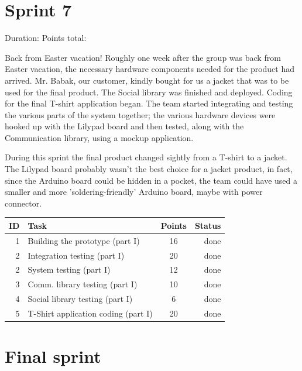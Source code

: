 \newpage

\section{Sprint 7}

Duration:
Points total:

Back from Easter vacation! Roughly one week after the group
was back from Easter vacation, the necessary hardware components needed for the product
had arrived. Mr. Babak, our customer, kindly bought for us a jacket that was to be used
for the final product. The Social library was finished and deployed.
Coding for the final T-shirt application began. The team started integrating
and testing the various parts of the system together; the various hardware devices were
hooked up with the Lilypad board and then tested, along with the Communication library,
using a mockup application.

During this sprint the final product changed sightly from a T-shirt to a jacket.
The Lilypad board probably wasn't the best choice for a jacket product, in fact,
since the Arduino board could be hidden in a pocket, the team could have used a smaller
and more 'soldering-friendly' Arduino board, maybe with power connector.

\begin{table}[ht!]
\begin{tabular}{ | r | l | c | r | }

\hline
\textbf{ID} & \textbf{Task} & \textbf{Points} & \textbf{Status} \\
\hline


1 & Building the prototype	(part I)	& 16 & done \\
\hline
2 & Integration testing		(part I)	& 20 & done \\
\hline
2 & System testing			(part I)	& 12 & done \\
\hline
3 & Comm. library testing	(part I)	& 10 & done \\
\hline
4 & Social library testing	(part I)	& 6  & done \\
\hline
5 & T-Shirt application coding (part I)	& 20 & done \\
\hline


\end{tabular}
\end{table}



\newpage

\section{Final sprint}

